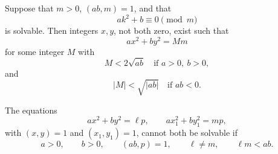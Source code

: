 \begin{proposition}
Suppose that $m>0$, $(ab,m)=1$, and that
\[
    ak^2+b\equiv0\pmod m
\]
is solvable. Then integers $x,y$, not both zero, exist such that
\[
    ax^2+by^2=Mm
\]
for some integer $M$ with
\[
    M<2\sqrt{ab}\quad\text{if }a>0,\ b>0,
\]
and
\[
    |M|<\sqrt{|ab|}\quad\text{if }ab<0.
\]
\end{proposition}

\begin{proposition}
The equations
\[
    ax^2+by^2=\ell p,\qquad ax_1^2+by_1^2=mp,
\]
with $(x,y)=1$ and $(x_1,y_1)=1$, cannot both be solvable if
\[
    a>0,\qquad b>0,\qquad (ab,p)=1,\qquad \ell\ne m,\qquad \ell m<ab.
\]
\end{proposition}
